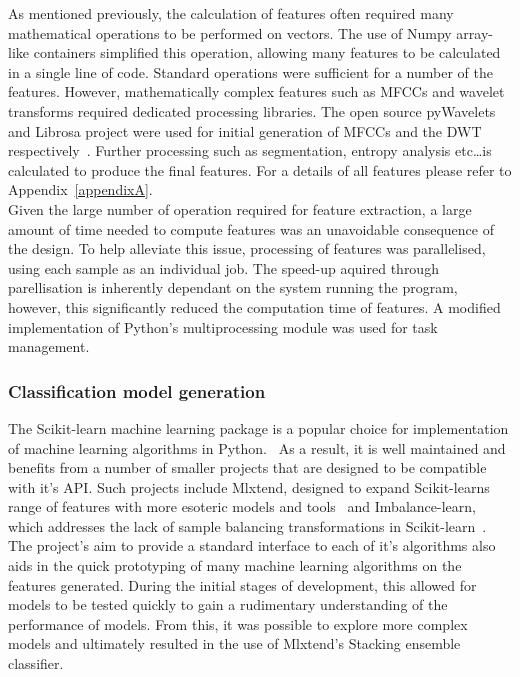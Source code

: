 \documentclass[titlepage, 12pt]{scrartcl} \usepackage{enumitem}
\begin{document}
As mentioned previously, the calculation of features often required many
mathematical operations to be performed on vectors. The use of Numpy array-like
containers simplified this operation, allowing many features to be calculated
in a single line of code. Standard operations were sufficient for a number of
the features. However, mathematically complex features such as MFCCs and
wavelet transforms required dedicated processing libraries. The open source
pyWavelets and Librosa project were used for initial generation of MFCCs and
the DWT respectively~\parencite{pyWave, Mcfee2015}. Further processing such as
segmentation, entropy analysis etc\ldots is calculated to produce the final
features. For a details of all features please refer to
Appendix~\ref{appendixA}.\\

Given the large number of operation required for feature extraction, a large
amount of time needed to compute features was an unavoidable consequence of
the design. To help alleviate this issue, processing of features was
parallelised, using each sample as an individual job. The speed-up aquired
through parellisation is inherently dependant on the system running the
program, however, this significantly reduced the computation time of features.
A modified implementation of Python's multiprocessing module was used for task
management.

\subsubsection{Classification model generation}\label{Sklearn}
The Scikit-learn machine learning package is a popular choice for
implementation of machine learning algorithms in
Python.~\parencite{Pedregosa2011} As a result, it is well maintained and
benefits from a number of smaller projects that are designed to be compatible
with it's API. Such projects include Mlxtend, designed to expand Scikit-learns
range of features with more esoteric models and tools~\parencite{Raschka2016,}
and Imbalance-learn, which addresses the lack of sample balancing
transformations in Scikit-learn~\parencite{Lemaitre2017}. The project's aim to
provide a standard interface to each of it's algorithms also aids in the quick
prototyping of many machine learning algorithms on the features generated.
During the initial stages of development, this allowed for models to be tested
quickly to gain a rudimentary understanding of the performance of models. From
this, it was possible to explore more complex models and ultimately resulted in
the use of Mlxtend's Stacking ensemble classifier.\\
\end{document}
